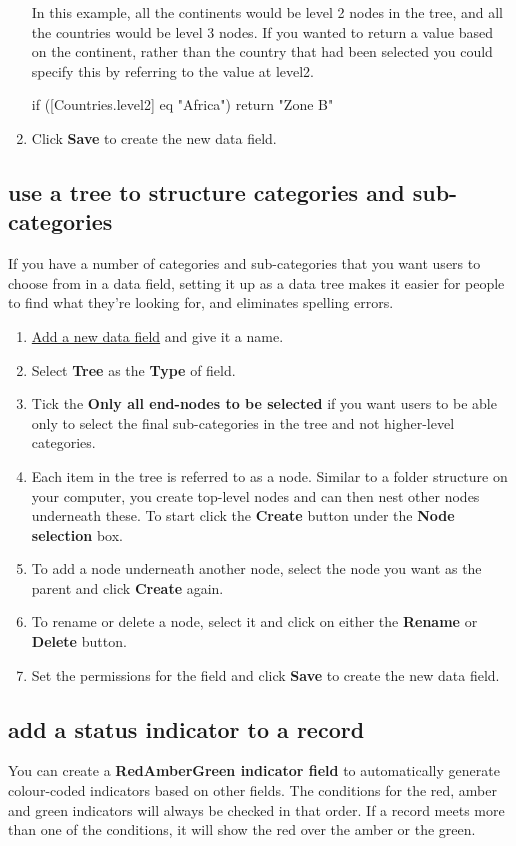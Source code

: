 \documentclass{ctrlo-int-toc}
\begin{document}
\begin{admin}
\begin{enumerate}
In this example, all the continents would be level 2 nodes in the tree, and all the countries would be level 3 nodes. If you wanted to return a value based on the continent, rather than the country that had been selected you could specify this by referring to the value at level2. \ 

\begin{code}
if ([Countries.level2] eq "Africa") {
    return "Zone B"
}
\end{code}

\item Click \textbf{Save} to create the new data field. 
\end{enumerate}
\subsection[use a tree to structure categories and sub{}-categories]{use a tree to structure categories and sub-categories}
\label{subsec:fieldtree}
If you have a number of categories and sub-categories that you want users to choose from in a data field, setting it up as a data tree makes it easier for people to find what they're looking for, and eliminates spelling errors. 

\begin{enumerate}
\item \hyperref[subsec:addfield]{Add a new data field} and give it a name.
\item Select \textbf{Tree} as the \textbf{Type} of field. 
\item Tick the \textbf{Only all end-nodes to be selected} if you want users to be able only to select the final sub-categories in the tree and not higher-level categories.
\item Each item in the tree is referred to as a node. Similar to a folder structure on your computer, you create top-level nodes and can then nest other nodes underneath these. To start click the \textbf{Create} button under the \textbf{Node selection} box. 
\item To add a node underneath another node, select the node you want as the parent and click \textbf{Create} again.
\item To rename or delete a node, select it and click on either the \textbf{Rename} or \textbf{Delete} button. 
\item Set the permissions for the field and click \textbf{Save} to create the new data field. 
\end{enumerate}
\subsection[add a status indicator to a record ]{add a status indicator to a record }
\label{subsec:fieldrag}
You can create a \textbf{RedAmberGreen indicator field} to automatically generate colour-coded indicators based on other fields. The conditions for the red, amber and green indicators will always be checked in that order. If a record meets more than one of the conditions, it will show the red over the amber or the green. 


\end{admin}
\end{document}

